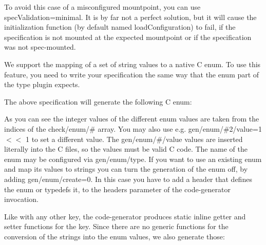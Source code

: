 To avoid this case of a misconfigured mountpoint, you can use {\ttfamily spec\+Validation=minimal}. It is by far not a perfect solution, but it will cause the initialization function (by default named {\ttfamily load\+Configuration}) to fail, if the specification is not mounted at the expected mountpoint or if the specification was not {\ttfamily spec-\/mount}ed.

We support the mapping of a set of string values to a native C {\ttfamily enum}. To use this feature, you need to write your specification the same way that the enum part of the {\ttfamily type} plugin expects.


\begin{DoxyCode}{0}
\DoxyCodeLine{[myenum]}
\end{DoxyCode}


The above specification will generate the following C {\ttfamily enum}\+:


\begin{DoxyCode}{0}
\DoxyCodeLine{\textcolor{keyword}{typedef} \textcolor{keyword}{enum}}
\DoxyCodeLine{\{}
\end{DoxyCode}


As you can see the integer values of the different enum values are taken from the indices of the {\ttfamily check/enum/\#} array. You may also use e.\+g. {\ttfamily gen/enum/\#2/value=1 $<$$<$ 1} to set a different value. The {\ttfamily gen/enum/\#/value} values are inserted literally into the C files, so the values must be valid C code. The name of the enum may be configured via {\ttfamily gen/enum/type}. If you want to use an existing {\ttfamily enum} and map its values to strings you can turn the generation of the enum off, by adding {\ttfamily gen/enum/create=0}. In this case you have to add a header that defines the {\ttfamily enum} or {\ttfamily typedef}s it, to the {\ttfamily headers} parameter of the code-\/generator invocation.

Like with any other key, the code-\/generator produces {\ttfamily static inline} getter and setter functions for the key. Since there are no generic functions for the conversion of the strings into the enum values, we also generate those\+:


